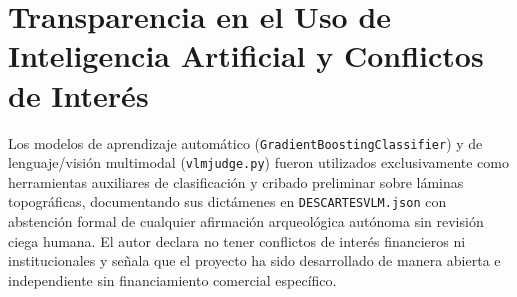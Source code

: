 \documentclass[11pt,a4paper]{article}
\DeclareRobustCommand{\_}{\ifmmode\mbox{\textunderscore}\else\textunderscore\allowbreak\fi}
\begin{document}
\section*{Transparencia en el Uso de Inteligencia Artificial y Conflictos de Inter\'es}

Los modelos de aprendizaje autom\'atico (\texttt{GradientBoostingClassifier}) y de lenguaje/visi\'on multimodal (\texttt{vlm\_judge.py}) fueron utilizados exclusivamente como herramientas auxiliares de clasificaci\'on y cribado preliminar sobre l\'aminas topogr\'aficas, documentando sus dict\'amenes en \texttt{DESCARTES\_VLM.json} con abstenci\'on formal de cualquier afirmaci\'on arqueol\'ogica aut\'onoma sin revisi\'on ciega humana. El autor declara no tener conflictos de inter\'es financieros ni institucionales y se\~nala que el proyecto ha sido desarrollado de manera abierta e independiente sin financiamiento comercial espec\'ifico.



\end{document}
